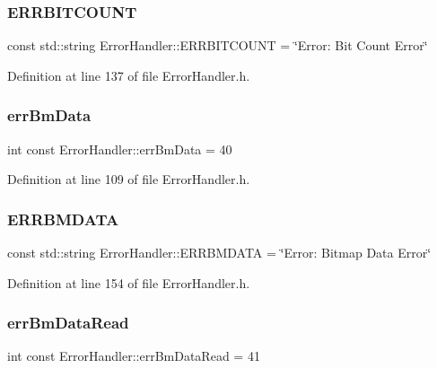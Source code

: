 \subsubsection{\texorpdfstring{ERRBITCOUNT}{ERRBITCOUNT}}
{\footnotesize\ttfamily const std\+::string Error\+Handler\+::\+E\+R\+R\+B\+I\+T\+C\+O\+U\+NT = \char`\"{}Error\+: Bit Count Error\char`\"{}\hspace{0.3cm}{\ttfamily [static]}}



Definition at line 137 of file Error\+Handler.\+h.

\mbox{\label{classErrorHandler_a0669b576bba1701445fc5e030cc23121}} 
\subsubsection{\texorpdfstring{errBmData}{errBmData}}
{\footnotesize\ttfamily int const Error\+Handler\+::err\+Bm\+Data = 40\hspace{0.3cm}{\ttfamily [static]}}



Definition at line 109 of file Error\+Handler.\+h.

\mbox{\label{classErrorHandler_a8aa9a03085699f122048543d17a74796}} 
\subsubsection{\texorpdfstring{ERRBMDATA}{ERRBMDATA}}
{\footnotesize\ttfamily const std\+::string Error\+Handler\+::\+E\+R\+R\+B\+M\+D\+A\+TA = \char`\"{}Error\+: Bitmap Data Error\char`\"{}\hspace{0.3cm}{\ttfamily [static]}}



Definition at line 154 of file Error\+Handler.\+h.

\mbox{\label{classErrorHandler_aa4d84bd14f132bc85fd7bccd9849b084}} 
\subsubsection{\texorpdfstring{errBmDataRead}{errBmDataRead}}
{\footnotesize\ttfamily int const Error\+Handler\+::err\+Bm\+Data\+Read = 41\hspace{0.3cm}{\ttfamily [static]}}



